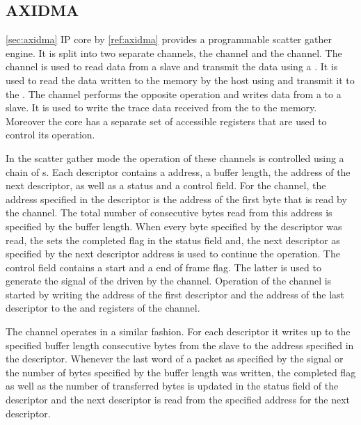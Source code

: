\subsection{AXIDMA}\ref{sec:axidma}
\AXIDMA{} IP core by \Xilinx{}\autoref{ref:axidma} provides a programmable scatter gather \DMA{} engine. It is split into two separate channels, the \MMToS{} channel and the \SToMM{} channel.
The \MMToS{} channel is used to read data from a \AXI{} slave and transmit the data using a \AXIStream{}. It is used to read the data written to the \DDR{} memory by the host using \FAXI{} and transmit it to the \pbexec{}. The \SToMM{} channel performs the opposite operation and writes data from a \AXIStream{} to a \AXI{} slave. It is used to write the trace data received from the \pbexec{} to the \DDR{} memory.
Moreover the \AXIDMA{} core has a separate set of \AXILite{} accessible registers that are used to control its operation.

In the scatter gather mode the operation of these channels is controlled using a chain of \descriptor{}s.
Each descriptor contains a address, a buffer length, the address of the next descriptor, as well as a status and a control field. For the \MMToS{} channel, the address specified in the descriptor is the address of the first byte that is read by the channel. The total number of consecutive bytes read from this address is specified by the buffer length. When every byte specified by the descriptor was read, the \AXIDMA{} sets the completed flag in the status field and, the next descriptor as specified by the next descriptor address is used to continue the operation. The control field contains a start and a end of frame flag. The latter is used to generate the \TLAST{} signal of the \AXIStream{} driven by the \MMToS{} channel. Operation of the \MMToS{} channel is started by writing the address of the first descriptor and the address of the last descriptor to the \curdesc{} and \taildesc{} registers of the \MMToS{} channel.

The \SToMM{} channel operates in a similar fashion. For each descriptor it writes up to the specified buffer length consecutive bytes from the \SToMM{} \AXIStream{} slave to the address specified in the descriptor.
Whenever the last word of a packet as specified by the \TLAST{} signal or the number of bytes specified by the buffer length was written, the completed flag as well as the number of transferred bytes is updated in the status field of the descriptor and the next descriptor is read from the specified address for the next descriptor.

